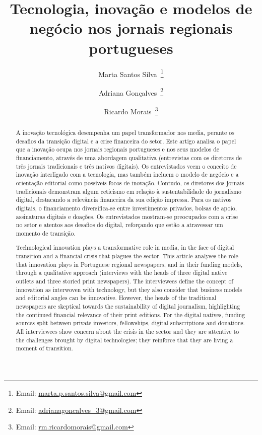 \documentclass[portuguese]{textolivre}
\title{Tecnologia, inovação e modelos de negócio nos jornais regionais portugueses}
\author[1]{Marta Santos Silva~\orcid{0009-0004-9148-3307}\thanks{Email: \href{mailto:marta.p.santos.silva@gmail.com}{marta.p.santos.silva@gmail.com}}}
\author[1]{Adriana Gonçalves~\orcid{0000-0002-8028-8248}\thanks{Email: \href{mailto:adrianagoncalves\_3@gmail.com}{adrianagoncalves\_3@gmail.com}}}
\author[2]{Ricardo Morais~\orcid{0000-0001-8827-0299}\thanks{Email: \href{mailto:rm.ricardomorais@gmail.com}{rm.ricardomorais@gmail.com}}}
\affil[1]{Universidade da Beira Interior, Faculdade de Artes e Letras, Labcom: Comunicação e Artes, Covilhã, Portugal.}
\affil[2]{Universidade do Porto, Faculdade de Artes e Humanidades, Porto, Portugal.}
\begin{document}
\maketitle
\begin{polyabstract}
\begin{abstract}
A inovação tecnológica desempenha um papel transformador nos media, perante os desafios da transição digital e a crise financeira do setor. Este artigo analisa o papel que a inovação ocupa nos jornais regionais portugueses e nos seus modelos de financiamento, através de uma abordagem qualitativa (entrevistas com os diretores de três jornais tradicionais e três nativos digitais). Os entrevistados veem o conceito de inovação interligado com a tecnologia, mas também incluem o modelo de negócio e a orientação editorial como possíveis focos de inovação. Contudo, os diretores dos jornais tradicionais demonstram algum ceticismo em relação à sustentabilidade do jornalismo digital, destacando a relevância financeira da sua edição impressa. Para os nativos digitais, o financiamento diversifica-se entre investimentos privados, bolsas de apoio, assinaturas digitais e doações. Os entrevistados mostram-se preocupados com a crise no setor e atentos aos desafios do digital, reforçando que estão a atravessar um momento de transição.

\end{abstract}

\begin{english}
\begin{abstract}
Technological innovation plays a transformative role in media, in the face of digital transition and a financial crisis that plagues the sector. This article analyses the role that innovation plays in Portuguese regional newspapers, and in their funding models, through a qualitative approach (interviews with the heads of three digital native outlets and three storied print newspapers). The interviewees define the concept of innovation as interwoven with technology, but they also consider that business models and editorial angles can be innovative. However, the heads of the traditional newspapers are skeptical towards the sustainability of digital journalism, highlighting the continued financial relevance of their print editions. For the digital natives, funding sources split between private investors, fellowships, digital subscriptions and donations. All interviewees show concern about the crisis in the sector and they are attentive to the challenges brought by digital technologies; they reinforce that they are living a moment of transition.

\end{abstract}
\end{english}
\end{polyabstract}
\end{document}
